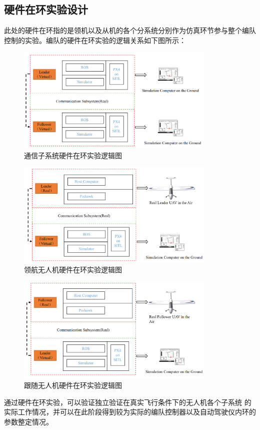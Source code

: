 \subsection{硬件在环实验设计}
此处的硬件在环指的是领机以及从机的各个分系统分别作为仿真环节参与整个编队
控制的实验。编队的硬件在环实验的逻辑关系如下图所示：
\begin{figure}[H]
    \centering
    \includegraphics[width=0.85\textwidth]{figures/adds/hard_loop_com}
    \caption{通信子系统硬件在环实验逻辑图}\label{fig：hard_loop_com}
\end{figure}
\begin{figure}[H]
    \centering
    \includegraphics[width=0.85\textwidth]{figures/adds/hard_loop_leader}
    \caption{领航无人机硬件在环实验逻辑图}\label{fig：hard_loop_leader}
\end{figure}
\begin{figure}[H]
    \centering
    \includegraphics[width=0.85\textwidth]{figures/adds/hard_loop_fol}
    \caption{跟随无人机硬件在环实验逻辑图}\label{fig：hard_loop_fol}
\end{figure}
通过硬件在环实验，可以验证独立验证在真实飞行条件下的无人机各个子系统
的实际工作情况，并可以在此阶段得到较为实际的编队控制器以及自动驾驶仪内环的
参数整定情况。

